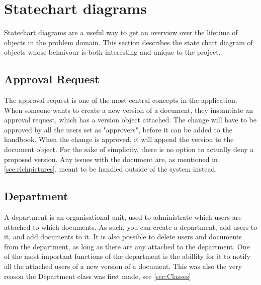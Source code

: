 \section{Statechart diagrams} \label{sec:statechart}
Statechart diagrams are a useful way to get an overview over the lifetime of objects in the problem domain.
This section describes the state chart diagram of objects whose behaivour is both interesting and unique to the project.

\subsection{Approval Request}
The approval request is one of the most central concepts in the application.
When someone wants to create a new version of a document, they instantiate an approval request, which has a version object attached.
The change will have to be approved by all the users set as "approvers", before it can be added to the handbook.
When the change is approved, it will append the version to the document object.
For the sake of simplicity, there is no option to actually deny a proposed version.
Any issues with the document are, as mentioned in \cref{sec:richpictures}, meant to be handled outside of the system instead.


\subsection{Department}
A department is an organisational unit, used to administrate which users are attached to which documents.
As such, you can create a department, add users to it, and add documents to it.
It is also possible to delete users and documents from the department, as long as there are any attached to the department.
One of the most important functions of the department is the abillity for it to notify all the attached users of a new version of a document.
This was also the very reason the Department class was first made, see \cref{sec:Classes}

